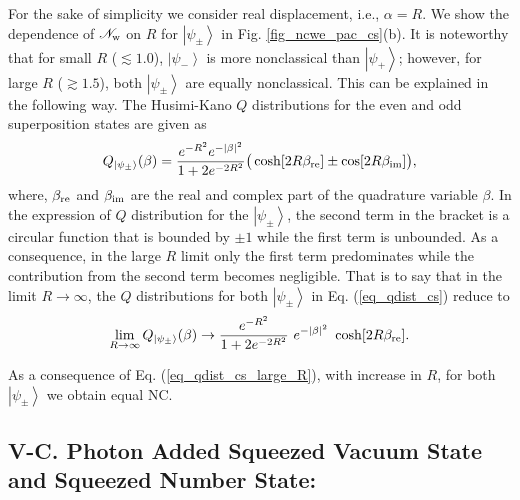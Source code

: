 \documentclass[letter,scriptaddress,twocolumn,prl,showkeys]{revtex4}
\newcommand{\ket}[1]{\left| #1 \right\rangle}
\begin{document}
For the sake of simplicity we consider real displacement, i.e., $\alpha=R$.
We show the dependence of $\mathscr{N}_{\rm{w}}$ on $R$ for $\ket{\psi_{\pm}}$ in Fig. \ref{fig_ncwe_pac_cs}(b). 
It is noteworthy that for small $R$ ($\lesssim 1.0$), $\ket{\psi_{-}}$ is
more nonclassical than $\ket{\psi_{+}}$; however, for large $R$ ($\gtrsim 1.5$), both $\ket{\psi_{\pm}}$ are equally nonclassical. 
This can be explained in the following way.
The Husimi-Kano $Q$ distributions for the even and odd superposition states are given as 
\begin{equation}
Q_{\ket{\psi_{\pm}}}(\beta)=\frac{e^{-R^{2}}e^{-|\beta|^{2}}}{1+2e^{-2R^{2}}}\big( \cosh [2R\beta_{\rm{re}}]\pm \cos [2R\beta_{\rm{im}}] \big),
\label{eq_qdist_cs}
\end{equation}
where, $\beta_{\rm{re}}$ and $\beta_{\rm{im}}$ are the real and complex part of the quadrature variable $\beta$.
In the expression of $Q$ distribution for the $\ket{\psi_{\pm}}$, the second term in the bracket is a circular function that is bounded by $\pm 1$ while the first term is unbounded.
As a consequence, in the large $R$ limit only the first term predominates while the contribution from the second term becomes negligible.
That is to say that in the limit $R\rightarrow \infty$, the $Q$ distributions for both $\ket{\psi_{\pm}}$ in Eq. (\ref{eq_qdist_cs}) reduce to 
\begin{equation}
\lim_{R\rightarrow\infty} Q_{\ket{\psi_{\pm}}}(\beta) \rightarrow \frac{e^{-R^{2}}}{1+2e^{-2R^{2}}}~e^{-|\beta|^{2}}~\cosh [2R\beta_{\rm{re}}].
\label{eq_qdist_cs_large_R}
\end{equation}

As a consequence of Eq. (\ref{eq_qdist_cs_large_R}), with increase in $R$, for both $\ket{\psi_{\pm}}$ we obtain equal NC.

\subsection*{V-C. Photon Added Squeezed Vacuum State and Squeezed Number State:}
\end{document}
